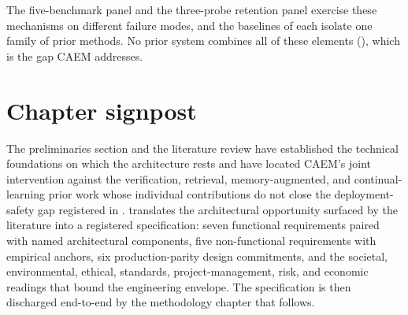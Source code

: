 The five-benchmark panel and the three-probe retention panel exercise these mechanisms on different failure modes, and the baselines of  each isolate one family of prior methods. No prior system combines all of these elements (), which is the gap CAEM addresses.

\section{Chapter signpost}
\label{sec:ch2-signpost}

The preliminaries section and the literature review have established the technical foundations on which the architecture rests and have located CAEM's joint intervention against the verification, retrieval, memory-augmented, and continual-learning prior work whose individual contributions do not close the deployment-safety gap registered in .  translates the architectural opportunity surfaced by the literature into a registered specification: seven functional requirements paired with named architectural components, five non-functional requirements with empirical anchors, six production-parity design commitments, and the societal, environmental, ethical, standards, project-management, risk, and economic readings that bound the engineering envelope. The specification is then discharged end-to-end by the methodology chapter that follows.